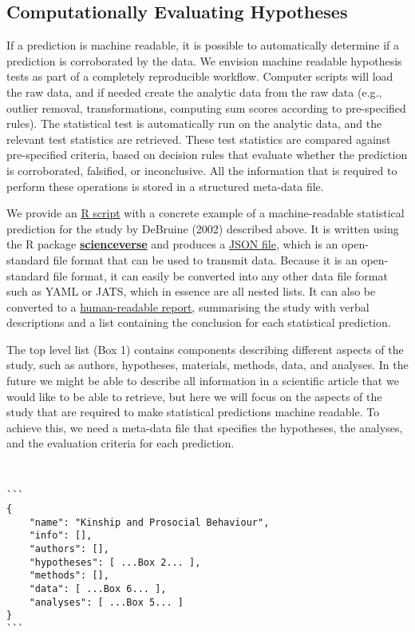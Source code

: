 \documentclass[english,doc,floatsintext]{apa6}
\begin{document}
\hypertarget{computationally-evaluating-hypotheses}{%
\subsection{Computationally Evaluating Hypotheses}\label{computationally-evaluating-hypotheses}}

If a prediction is machine readable, it is possible to automatically determine if a prediction is corroborated by the data. We envision machine readable hypothesis tests as part of a completely reproducible workflow. Computer scripts will load the raw data, and if needed create the analytic data from the raw data (e.g., outlier removal, transformations, computing sum scores according to pre-specified rules). The statistical test is automatically run on the analytic data, and the relevant test statistics are retrieved. These test statistics are compared against pre-specified criteria, based on decision rules that evaluate whether the prediction is corroborated, falsified, or inconclusive. All the information that is required to perform these operations is stored in a structured meta-data file.

We provide an \href{example/example.Rmd}{R script} with a concrete example of a machine-readable statistical prediction for the study by DeBruine (2002) described above. It is written using the R package \href{https://scienceverse.github.io/scienceverse/}{\textbf{scienceverse}} and produces a \href{example/postreg.json}{JSON file}, which is an open-standard file format that can be used to transmit data. Because it is an open-standard file format, it can easily be converted into any other data file format such as YAML or JATS, which in essence are all nested lists. It can also be converted to a \href{example/postreg.html}{human-readable report}, summarising the study with verbal descriptions and a list containing the conclusion for each statistical prediction.

The top level list (Box 1) contains components describing different aspects of the study, such as authors, hypotheses, materials, methods, data, and analyses. In the future we might be able to describe all information in a scientific article that we would like to be able to retrieve, but here we will focus on the aspects of the study that are required to make statistical predictions machine readable. To achieve this, we need a meta-data file that specifies the hypotheses, the analyses, and the evaluation criteria for each prediction.

\begin{tcolorbox}[colback=black!5!white,colframe=white!5!black,title=Box 1. The top-level structure of the machine-readable study description.]
\begin{verbatim}


```
{
    "name": "Kinship and Prosocial Behaviour",
    "info": [],
    "authors": [],
    "hypotheses": [ ...Box 2... ],
    "methods": [],
    "data": [ ...Box 6... ],
    "analyses": [ ...Box 5... ]
}
```

\end{verbatim}
\end{tcolorbox}
\end{document}
